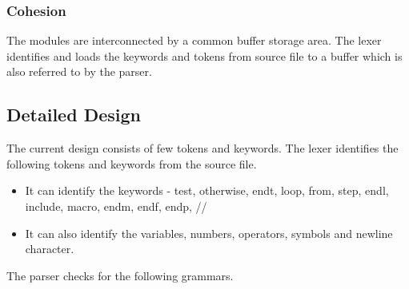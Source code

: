 \documentclass[12pt, oneside, a4paper]{article}
\begin{document}
\subsubsection{Cohesion}
The modules are interconnected by a common buffer storage area.  The lexer identifies and loads the keywords and tokens from source file to a buffer which is also referred to by the parser.

\subsection{Detailed Design}
The current design consists of few tokens and keywords.  The lexer identifies the following tokens and keywords from the source file.\\
\begin{itemize}
\item It can identify the keywords - test, otherwise, endt,  loop, from, step, endl, include, macro, endm, endf, endp, //
\item It can also identify the variables, numbers, operators, symbols and newline character.
\end{itemize}
The parser checks for the following grammars.
\end{document}
